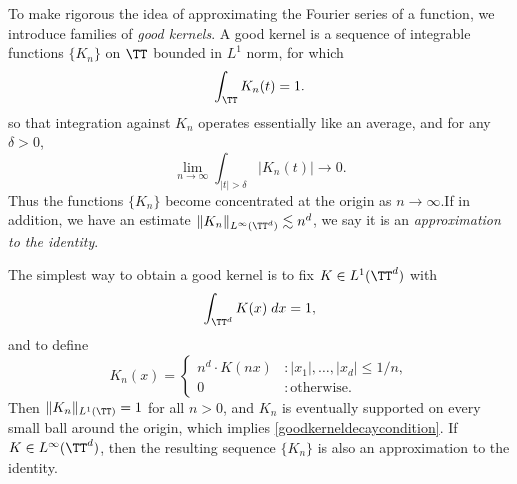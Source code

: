 To make rigorous the idea of approximating the Fourier series of a function, we introduce families of \emph{good kernels}. A good kernel is a sequence of integrable functions $\{ K_n \}$ on $\TT$ bounded in $L^1$ norm, for which
%
\[ \int_{\TT} K_n(t) = 1. \]
%
so that integration against $K_n$ operates essentially like an average, and for any $\delta > 0$,
%
\begin{equation} \label{goodkerneldecaycondition}
    \lim_{n \to \infty} \int_{|t| > \delta} |K_n(t)| \to 0.
\end{equation}
%
Thus the functions $\{ K_n \}$ become concentrated at the origin as $n \to \infty$.If in addition, we have an estimate $\| K_n \|_{L^\infty(\TT^d)} \lesssim n^d$, we say it is an \emph{approximation to the identity}.

\begin{example}
    The simplest way to obtain a good kernel is to fix $K \in L^1(\TT^d)$ with
    \[ \int_{\TT^d} K(x)\; dx = 1, \]
    and to define
    \[ K_n(x) = \begin{cases} n^d \cdot K(nx) &: |x_1|, \dots, |x_d| \leq 1/n, \\ 0 &: \text{otherwise}. \end{cases} \]
    Then $\| K_n \|_{L^1(\TT)} = 1$ for all $n > 0$, and $K_n$ is eventually supported on every small ball around the origin, which implies \eqref{goodkerneldecaycondition}. If $K \in L^\infty(\TT^d)$, then the resulting sequence $\{ K_n \}$ is also an approximation to the identity.
\end{example}

